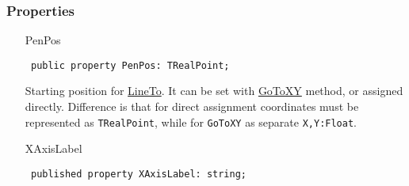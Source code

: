 \documentclass[12pt,a4paper,oneside]{report}
\newcommand{\declarationitem}[1]{{\addfontfeatures{FakeBold=1.3} #1}}
\newcommand{\code}[1]{\texttt{#1}}
\begin{document}
\subsubsection{Properties}
\begin{itemize}\label{lmcoordsys.TCoordSys-PenPos}
\item[\declarationitem{PenPos}\hfill]
\begin{flushleft}
\code{
public property PenPos: TRealPoint;}
\end{flushleft}

Starting position for \hyperref[sec:lineto]{LineTo}. It can be set with \hyperref[lmcoordsys.TCoordSys-GoToXY]{GoToXY} method, or assigned directly. Difference is that for direct assignment coordinates must be represented as \code{TRealPoint}, while for \code{GoToXY} as separate \code{X,Y:Float}. \label{lmcoordsys.TCoordSys-XAxisLabel}
\item[\declarationitem{XAxisLabel}\hfill]
\begin{flushleft}
\code{
published property XAxisLabel: string;}\label{lmcoordsys.TCoordSys-YAxisLabel}
\end{flushleft}


\end{itemize}
\end{document}
